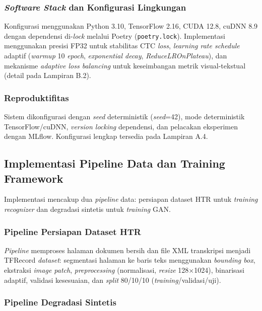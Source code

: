 \subsubsection{\textit{Software Stack} dan Konfigurasi Lingkungan}
\label{subsubsec:software-spec}

Konfigurasi menggunakan Python 3.10, TensorFlow 2.16, CUDA 12.8, cuDNN 8.9 dengan dependensi di-\textit{lock} melalui Poetry (\texttt{poetry.lock}). Implementasi menggunakan presisi FP32 untuk stabilitas CTC \textit{loss}, \textit{learning rate schedule} adaptif (\textit{warmup} 10 \textit{epoch}, \textit{exponential decay}, \textit{ReduceLROnPlateau}), dan mekanisme \textit{adaptive loss balancing} untuk keseimbangan metrik visual-tekstual (detail pada Lampiran B.2).

\subsubsection{Reproduktifitas}
\label{subsubsec:reproducibility}

Sistem dikonfigurasi dengan \textit{seed} deterministik (\textit{seed}=42), mode deterministik TensorFlow/cuDNN, \textit{version locking} dependensi, dan pelacakan eksperimen dengan MLflow. Konfigurasi lengkap tersedia pada Lampiran A.4.

\subsection{Implementasi Pipeline Data dan Training Framework}
\label{subsec:implementasi-pipeline}

Implementasi mencakup dua \textit{pipeline} data: persiapan dataset HTR untuk \textit{training recognizer} dan degradasi sintetis untuk \textit{training} GAN.

\subsubsection{Pipeline Persiapan Dataset HTR}
\label{subsubsec:dataset-htr-pipeline}

\textit{Pipeline} memproses halaman dokumen bersih dan file XML transkripsi menjadi TFRecord \textit{dataset}: segmentasi halaman ke baris teks menggunakan \textit{bounding box}, ekstraksi \textit{image patch}, \textit{preprocessing} (normalisasi, \textit{resize} 128×1024), binarisasi adaptif, validasi kesesuaian, dan \textit{split} 80/10/10 (\textit{training}/validasi/uji).

\subsubsection{Pipeline Degradasi Sintetis}
\label{subsubsec:synthetic-degradation-pipeline}

